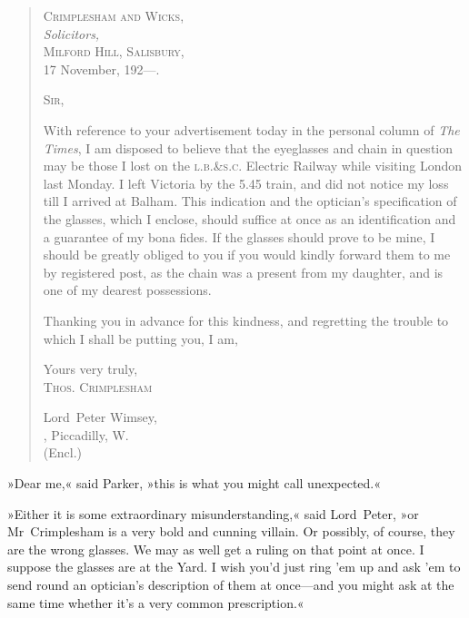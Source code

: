 \begin{quotation}
\begin{flushright}
\hfill
\begin{minipage}{0.5\linewidth}
\textsc{Crimplesham and Wicks,}\\
\vin \textit{Solicitors,}\\
\textsc{Milford Hill, Salisbury,}\\
17 November, 192---.
\end{minipage}
\end{flushright}

\noindent \textsc{Sir,}

With reference to your advertisement today in the personal column of \textit{The Times}, I am disposed to believe that the eyeglasses and chain in question may be those I lost on the \textsc{l.b.\&s.c.} Electric Railway while visiting London last Monday. I left Victoria by the 5.45 train, and did not notice my loss till I arrived at Balham. This indication and the optician's specification of the glasses, which I enclose, should suffice at once as an identification and a guarantee of my bona fides. If the glasses should prove to be mine, I should be greatly obliged to you if you would kindly forward them to me by registered post, as the chain was a present from my daughter, and is one of my dearest possessions.

Thanking you in advance for this kindness, and regretting the trouble to which I shall be putting you, I am,

\begin{flushright}
Yours very truly,\\
\textsc{Thos. Crimplesham}\\
\end{flushright}

\noindent Lord~Peter Wimsey,\\
, Piccadilly, W.\\
\noindent (Encl.)
\end{quotation}

»Dear me,« said Parker, »this is what you might call unexpected.«

»Either it is some extraordinary misunderstanding,« said Lord~Peter, »or Mr~Crimplesham is a very bold and cunning villain. Or possibly, of course, they are the wrong glasses. We may as well get a ruling on that point at once. I suppose the glasses are at the Yard. I wish you'd just ring 'em up and ask 'em to send round an optician's description of them at once—and you might ask at the same time whether it's a very common prescription.«

